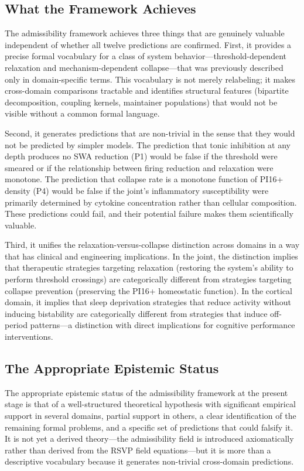 \documentclass[12pt, a4paper]{article}
\theoremstyle{definition}
\begin{document}
\subsection{What the Framework Achieves}

The admissibility framework achieves three things that are genuinely valuable independent of whether all twelve predictions are confirmed. First, it provides a precise formal vocabulary for a class of system behavior---threshold-dependent relaxation and mechanism-dependent collapse---that was previously described only in domain-specific terms. This vocabulary is not merely relabeling; it makes cross-domain comparisons tractable and identifies structural features (bipartite decomposition, coupling kernels, maintainer populations) that would not be visible without a common formal language.

Second, it generates predictions that are non-trivial in the sense that they would not be predicted by simpler models. The prediction that tonic inhibition at any depth produces no SWA reduction (P1) would be false if the threshold were smeared or if the relationship between firing reduction and relaxation were monotone. The prediction that collapse rate is a monotone function of PI16+ density (P4) would be false if the joint's inflammatory susceptibility were primarily determined by cytokine concentration rather than cellular composition. These predictions could fail, and their potential failure makes them scientifically valuable.

Third, it unifies the relaxation-versus-collapse distinction across domains in a way that has clinical and engineering implications. In the joint, the distinction implies that therapeutic strategies targeting relaxation (restoring the system's ability to perform threshold crossings) are categorically different from strategies targeting collapse prevention (preserving the PI16+ homeostatic function). In the cortical domain, it implies that sleep deprivation strategies that reduce activity without inducing bistability are categorically different from strategies that induce off-period patterns---a distinction with direct implications for cognitive performance interventions.

\subsection{The Appropriate Epistemic Status}

The appropriate epistemic status of the admissibility framework at the present stage is that of a well-structured theoretical hypothesis with significant empirical support in several domains, partial support in others, a clear identification of the remaining formal problems, and a specific set of predictions that could falsify it. It is not yet a derived theory---the admissibility field is introduced axiomatically rather than derived from the RSVP field equations---but it is more than a descriptive vocabulary because it generates non-trivial cross-domain predictions.
\end{document}
